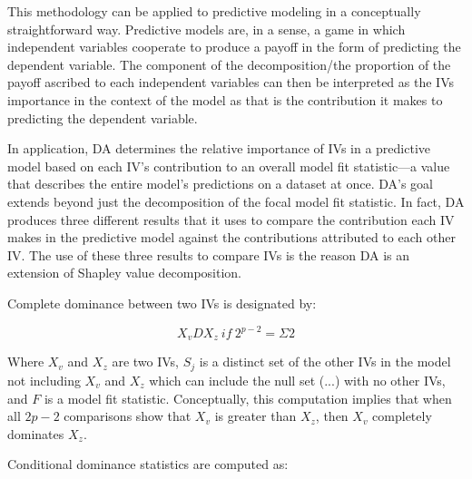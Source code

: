 \documentclass[ShortAfour,times,sageapa]{sagej}
\begin{document}
	
	This methodology can be applied to predictive modeling in a conceptually straightforward way.
	 Predictive models are, in a sense, a game in which independent variables cooperate to produce a payoff in the form of predicting the dependent variable. 
	The component of the decomposition/the proportion of the payoff ascribed to each independent variables can then be interpreted as the IVs importance in the context of the model as that is the contribution it makes to predicting the dependent variable.
	
	
	In application, DA determines the relative importance of IVs in a predictive model based on each IV’s contribution to an overall model fit statistic—a value that describes the entire model’s predictions on a dataset at once. 
	DA’s goal extends beyond just the decomposition of the focal model fit statistic. 
	In fact, DA produces three different results that it uses to compare the contribution each IV makes in the predictive model against the contributions attributed to each other IV. 
	The use of these three results to compare IVs is the reason DA is an extension of Shapley value decomposition.
	
	Complete dominance between two IVs is designated by:
	
	\begin{equation}
		X_{v}DX_{z}\ if\ 2^{p-2} = \Sigma{2} %
	\end{equation}
	
	Where $X_v$ and $X_z$ are two IVs, $S_j$ is a distinct set of the other IVs in the model not including $X_v$ and $X_z$ which can include the null set (...) with no other IVs, and $F$ is a model fit statistic. Conceptually, this computation implies that when all $2p-2$ comparisons show that $X_v$ is greater than $X_z$, then $X_v$ completely dominates $X_z$.
	
	Conditional dominance statistics are computed as:
	
\end{document}
